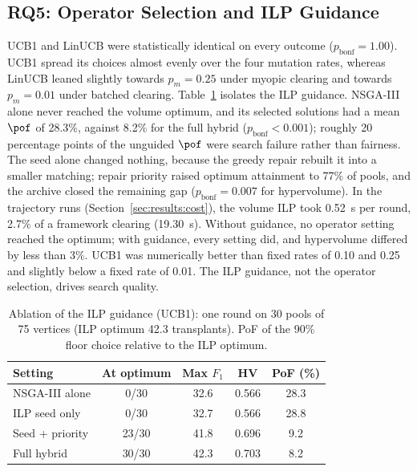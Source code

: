 \documentclass[journal]{IEEEtran}
\begin{document}
\subsection{RQ5: Operator Selection and ILP Guidance}
\label{sec:results:rq5}
UCB1 and LinUCB were statistically identical on every outcome
($p_{\mathrm{bonf}} = 1.00$). UCB1 spread its choices almost evenly over
the four mutation rates, whereas LinUCB leaned slightly towards
$p_m = 0.25$ under myopic clearing and towards $p_m = 0.01$ under
batched clearing. Table~\ref{tab:ablation} isolates the ILP guidance.
NSGA-III alone never reached the volume optimum, and its selected
solutions had a mean $\pof$ of 28.3\%, against 8.2\% for the full
hybrid ($p_{\mathrm{bonf}} < 0.001$); roughly 20 percentage points of
the unguided $\pof$ were search failure rather than fairness. The seed
alone changed nothing, because the greedy repair rebuilt it into a
smaller matching; repair priority raised optimum attainment to 77\% of
pools, and the archive closed the remaining gap
($p_{\mathrm{bonf}} = 0.007$ for hypervolume). In the trajectory runs (Section~\ref{sec:results:cost}), the volume ILP took 0.52~s per round, 2.7\% of a
framework clearing (19.30~s). Without guidance, no operator setting
reached the optimum; with guidance, every setting did, and
hypervolume differed by less than 3\%. UCB1 was numerically better than fixed rates of 0.10 and 0.25 and slightly below a fixed rate of 0.01. The ILP
guidance, not the operator selection, drives search quality.

\begin{table}[!htbp]
\caption{Ablation of the ILP guidance (UCB1): one round on 30 pools of 75
vertices (ILP optimum 42.3 transplants). PoF of the 90\% floor choice
relative to the ILP optimum.}
\label{tab:ablation}
\begin{tabular}{lcccc}
\toprule
Setting & At optimum & Max $F_1$ & HV & PoF (\%) \\
\midrule
NSGA-III alone  & 0/30  & 32.6 & 0.566 & 28.3 \\
ILP seed only   & 0/30  & 32.7 & 0.566 & 28.8 \\
Seed + priority & 23/30 & 41.8 & 0.696 & 9.2 \\
Full hybrid     & 30/30 & 42.3 & 0.703 & 8.2 \\
\bottomrule
\end{tabular}
\end{table}
\end{document}
